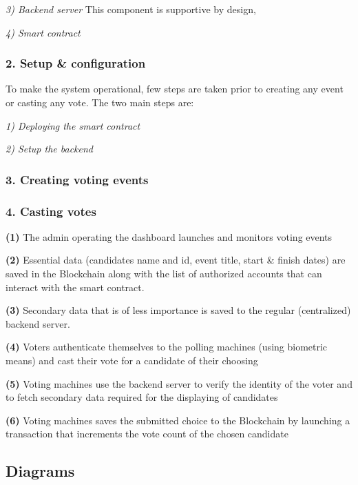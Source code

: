\textit{3) Backend server} This component is supportive by design, 

\textit{4) Smart contract}


\subsubsection{2. Setup \& configuration}

To make the system operational, few steps are taken prior to creating any event or casting any vote. The two main steps are:

\textit{1) Deploying the smart contract}

\textit{2) Setup the backend}

\subsubsection{3. Creating voting events}



\subsubsection{4. Casting votes}

\begin{list}{}{}
\item \textbf{(1)} The admin operating the dashboard launches and monitors voting events
\item \textbf{(2)} Essential data (candidates name and id, event title, start \& finish dates) are saved in the Blockchain along with the list of authorized accounts that can interact with the smart contract.
\item \textbf{(3)} Secondary data that is of less importance is saved to the regular (centralized) backend server.
\item \textbf{(4)} Voters authenticate themselves to the polling machines (using biometric means) and cast their vote for a candidate of their choosing
\item \textbf{(5)} Voting machines use the backend server to verify the identity of the voter and to fetch secondary data required for the displaying of candidates
\item \textbf{(6)} Voting machines saves the submitted choice to the Blockchain by launching a transaction that increments the vote count of the chosen candidate
\end{list}

\subsection{Diagrams}
